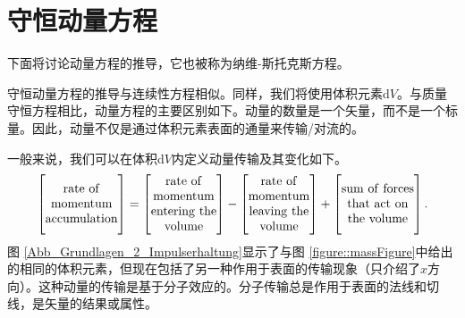 \documentclass[LBMDerivation.tex]{subfiles}
\begin{document}


\section{守恒动量方程}
\label{SECTION::momentum}
%
%
下面将讨论动量方程的推导，它也被称为纳维-斯托克斯方程。
	
守恒动量方程的推导与连续性方程相似。同样，我们将使用体积元素d$V$。与质量守恒方程相比，动量方程的主要区别如下。动量的数量是一个矢量，而不是一个标量。因此，动量不仅是通过体积元素表面的通量来传输/对流的。

%
%
	一般来说，我们可以在体积d$V$内定义动量传输及其变化如下。
%
%
\begin{equation}
\left[
 \vphantom{\begin{matrix} . \\ . \\ . \\ . \end{matrix}}
 \begin{matrix}
  \rmm{rate~of}\\
  \rmm{momentum}\\
  \rmm{accumulation}
 \end{matrix}
\right]
=
\left[
 \begin{matrix}
  \rmm{rate~of}\\
  \rmm{momentum}\\
  \rmm{entering~the}\\
  \rmm{volume}
 \end{matrix}
\right]
-
\left[
 \begin{matrix}
  \rmm{rate~of}\\
  \rmm{momentum}\\
  \rmm{leaving~the}\\
  \rmm{volume}
 \end{matrix}
\right]
+
\left[
 \vphantom{\begin{matrix} . \\ . \\ . \\ . \end{matrix}}
 \begin{matrix}
  \rmm{sum~of~forces}\\
  \rmm{that~act~on}\\
  \rmm{the~volume}
 \end{matrix}
\right] .
\label{EQUATION::momentum}
\end{equation}
%
%
	图 \ref{Abb_Grundlagen_2_Impulserhaltung}显示了与图 \ref{figure::massFigure}中给出的相同的体积元素，但现在包括了另一种作用于表面的传输现象（只介绍了$x$方向）。这种动量的传输是基于分子效应的。分子传输总是作用于表面的法线和切线，是矢量的结果或属性。
\end{document}
